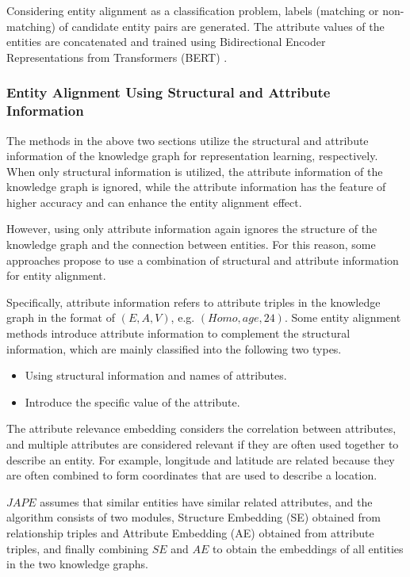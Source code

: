 \documentclass[sigconf]{acmart}
\begin{document}
{Considering entity alignment as a classification problem, labels (matching or non-matching) of candidate entity pairs are generated. The attribute values of the entities are concatenated and trained using Bidirectional Encoder Representations from Transformers (BERT) \cite{devlin2018bert}.

\subsubsection{Entity Alignment Using Structural and Attribute Information}

The methods in the above two sections utilize the structural and attribute information of the knowledge graph for representation learning, respectively. When only structural information is utilized, the attribute information of the knowledge graph is ignored, while the attribute information has the feature of higher accuracy and can enhance the entity alignment effect.

However, using only attribute information again ignores the structure of the knowledge graph and the connection between entities. For this reason, some approaches propose to use a combination of structural and attribute information for entity alignment.

Specifically, attribute information refers to attribute triples in the knowledge graph in the format of $(E,A,V)$, e.g. $(Homo, age, 24)$. Some entity alignment methods introduce attribute information to complement the structural information, which are mainly classified into the following two types.

\begin{itemize}
    \item Using structural information and names of attributes.
    \item Introduce the specific value of the attribute.
\end{itemize}

The attribute relevance embedding considers the correlation between attributes, and multiple attributes are considered relevant if they are often used together to describe an entity. For example, longitude and latitude are related because they are often combined to form coordinates that are used to describe a location.

$JAPE$ \cite{sun2017cross} assumes that similar entities have similar related attributes, and the algorithm consists of two modules, Structure Embedding (SE) obtained from relationship triples and Attribute Embedding (AE) obtained from attribute triples, and finally combining $SE$ and $AE$ to obtain the embeddings of all entities in the two knowledge graphs.

}
\end{document}
